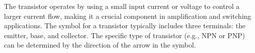 The transistor operates by using a small input current or voltage to control a larger current flow, making it a crucial component in amplification and switching applications. The symbol for a transistor typically includes three terminals: the emitter, base, and collector. The specific type of transistor (e.g., NPN or PNP) can be determined by the direction of the arrow in the symbol.

